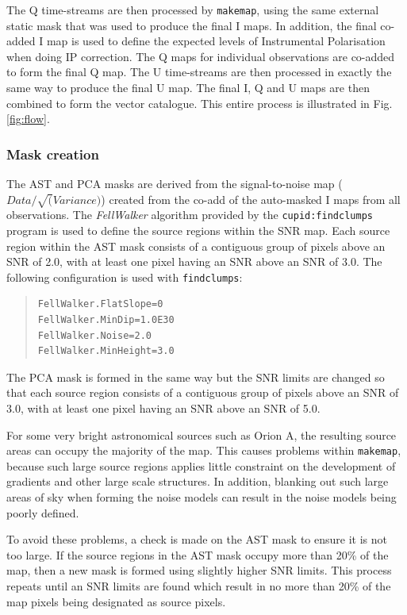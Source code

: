\documentclass[twoside,11pt]{starlink}
\begin{document}
The Q time-streams are then processed by \texttt{makemap}, using the same
external static mask that was used to produce the final I maps. In
addition, the final co-added I map is used to define the expected levels
of Instrumental Polarisation when doing IP correction. The Q maps for
individual observations are co-added to form the final Q map. The U
time-streams are then processed in exactly the same way to produce the
final U map. The final I, Q and U maps are then combined to form the
vector catalogue. This entire process is illustrated in
Fig.\ref{fig:flow}.

\subsubsection{Mask creation}
The AST and PCA masks are derived from the signal-to-noise map
($Data/\sqrt(Variance)$) created from the co-add of the auto-masked I
maps from all observations.  The \emph{FellWalker} algorithm provided by the
\texttt{cupid:findclumps} program is used to define the source regions within
the SNR map. Each source region within the AST mask consists of a contiguous
group of pixels above an SNR of 2.0, with at least one pixel having an SNR
above an SNR of 3.0. The following configuration is used with
\texttt{findclumps}:

\begin{quote}
\begin{verbatim}
FellWalker.FlatSlope=0
FellWalker.MinDip=1.0E30
FellWalker.Noise=2.0
FellWalker.MinHeight=3.0
\end{verbatim}
\end{quote}

The PCA mask is formed in the same way but the SNR limits are changed so
that each source region consists of a contiguous group of pixels above an
SNR of 3.0, with at least one pixel having an SNR above an SNR of 5.0.

For some very bright astronomical sources such as Orion A, the resulting
source areas can occupy the majority of the map. This causes problems
within \texttt{makemap}, because such large source regions applies little
constraint on the development of gradients and other large scale
structures. In addition, blanking out such large areas of sky when
forming the noise models can result in the noise models being poorly
defined.

To avoid these problems, a check is made on the AST mask to ensure it is
not too large. If the source regions in the AST mask occupy more than
20\% of the map, then a new mask is formed using slightly higher SNR
limits. This process repeats until an SNR limits are found which result
in no more than 20\% of the map pixels being designated as source pixels.
\end{document}
